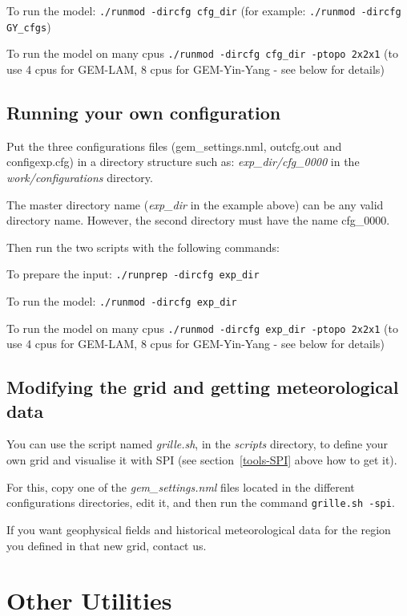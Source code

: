 \documentclass[11pt]{book}
\begin{document}
To run the model: \texttt{./runmod -dircfg cfg\_dir}
(for example:  \texttt{./runmod -dircfg GY\_cfgs})

To run the model on many cpus \texttt{./runmod -dircfg cfg\_dir  -ptopo 2x2x1} (to use 4 cpus for GEM-LAM,
  8 cpus for GEM-Yin-Yang - see below for details)

\section{Running your own configuration}

Put the three configurations files (gem\_settings.nml, outcfg.out and
configexp.cfg) in a directory structure such as: \textit{exp\_dir/cfg\_0000}
in the \textit{work/configurations} directory.

The master directory name (\textit{exp\_dir} in the example above) can be
any valid directory name. However, the second directory must have the name
cfg\_0000.

Then run the two scripts with the following commands:

To prepare the input: \texttt{./runprep -dircfg exp\_dir}

To run the model: \texttt{./runmod -dircfg exp\_dir}

To run the model on many cpus \texttt{./runmod -dircfg exp\_dir  -ptopo 2x2x1} (to use 4 cpus for GEM-LAM,
  8 cpus for GEM-Yin-Yang - see below for details)

\section{Modifying the grid and getting meteorological data}

You can use the script named \textit{grille.sh}, in the \textit{scripts}
directory, to define your own grid and visualise it with SPI (see
section~\ref{tools-SPI} above how to get it).

For this, copy one of the \textit{gem\_settings.nml} files located in the
different configurations directories, edit it, and then run the command
\texttt{grille.sh -spi}.

If you want geophysical fields and historical meteorological data for the
region you defined in that new grid, contact us.

\chapter{Other Utilities}
\label{utilities}
\end{document}
